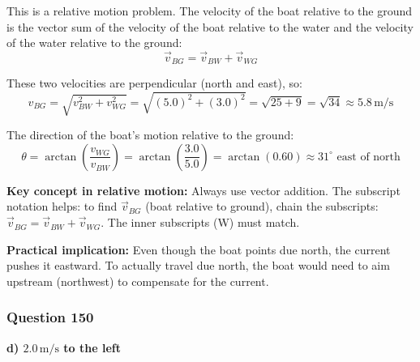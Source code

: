 \documentclass[12pt,letterpaper]{article}
\begin{document}
\begin{explanationbox}
This is a relative motion problem. The velocity of the boat relative to the ground is the vector sum of the velocity of the boat relative to the water and the velocity of the water relative to the ground:
\[
\vec{v}_{BG} = \vec{v}_{BW} + \vec{v}_{WG}
\]

These two velocities are perpendicular (north and east), so:
\[
v_{BG} = \sqrt{v_{BW}^2 + v_{WG}^2} = \sqrt{(5.0)^2 + (3.0)^2} = \sqrt{25 + 9} = \sqrt{34} \approx 5.8\,\text{m/s}
\]

The direction of the boat's motion relative to the ground:
\[
\theta = \arctan\left(\frac{v_{WG}}{v_{BW}}\right) = \arctan\left(\frac{3.0}{5.0}\right) = \arctan(0.60) \approx 31^\circ \text{ east of north}
\]

\textbf{Key concept in relative motion:} Always use vector addition. The subscript notation helps: to find $\vec{v}_{BG}$ (boat relative to ground), chain the subscripts: $\vec{v}_{BG} = \vec{v}_{BW} + \vec{v}_{WG}$. The inner subscripts (W) must match.

\textbf{Practical implication:} Even though the boat points due north, the current pushes it eastward. To actually travel due north, the boat would need to aim upstream (northwest) to compensate for the current.
\end{explanationbox}

\subsubsection*{Question 150}

\begin{answerbox}
\textbf{d) $2.0\,\text{m/s}$ to the left}
\end{answerbox}
\end{document}
